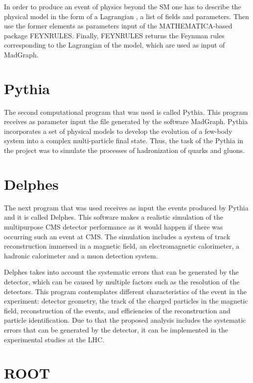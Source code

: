 In order to produce an event of physics beyond the SM one has to describe the physical model in the form of a Lagrangian , a list of fields and parameters. Then use the former elements as parameters input of the MATHEMATICA-based package FEYNRULES. Finally, FEYNRULES returns the Feynman rules corresponding to the Lagrangian of the model, which are used as input of MadGraph.


\section{Pythia}

The second computational program that was used is called Pythia. This program receives as parameter input the file generated by the software MadGraph. Pythia incorporates a set of physical models to develop the evolution of a few-body system into a complex multi-particle final state. Thus, the task of the Pythia in the project was to simulate the processes of hadronization of quarks and gluons.


\section{Delphes}

The next program that was used receives as input the events produced by Pythia and it is called Delphes. This software makes a realistic simulation of the multipurpose CMS detector performance as it would happen if there was occurring such an event at CMS. The simulation includes a system of track reconstruction immersed in a magnetic field, an electromagnetic calorimeter, a hadronic calorimeter and a muon detection system.

Delphes takes into account the systematic errors that can be generated by the detector, which can be caused by multiple factors such as the resolution of the detectors. This program contemplates different characteristics of the event in the experiment: detector geometry, the track of the charged particles in the magnetic field, reconstruction of the events, and efficiencies of the reconstruction and particle identification. Due to that the proposed analysis includes the systematic errors that can be generated by the detector, it can be implemented in the experimental studies at the LHC. 

\section{ROOT}

